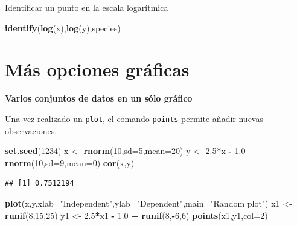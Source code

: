 \documentclass[]{book}
\newenvironment{Shaded}{\begin{snugshade}}{\end{snugshade}}
\newcommand{\KeywordTok}[1]{\textcolor[rgb]{0.13,0.29,0.53}{\textbf{#1}}}
\newcommand{\DataTypeTok}[1]{\textcolor[rgb]{0.13,0.29,0.53}{#1}}
\newcommand{\DecValTok}[1]{\textcolor[rgb]{0.00,0.00,0.81}{#1}}
\newcommand{\FloatTok}[1]{\textcolor[rgb]{0.00,0.00,0.81}{#1}}
\newcommand{\StringTok}[1]{\textcolor[rgb]{0.31,0.60,0.02}{#1}}
\newcommand{\OperatorTok}[1]{\textcolor[rgb]{0.81,0.36,0.00}{\textbf{#1}}}
\newcommand{\NormalTok}[1]{#1}
\begin{document}
Identificar un punto en la escala logarítmica

\begin{Shaded}
\begin{Highlighting}[]
\KeywordTok{identify}\NormalTok{(}\KeywordTok{log}\NormalTok{(x),}\KeywordTok{log}\NormalTok{(y),species)}
\end{Highlighting}
\end{Shaded}

\section{Más opciones gráficas}\label{muxe1s-opciones-gruxe1ficas}

\textbf{Varios conjuntos de datos en un sólo gráfico}

Una vez realizado un \texttt{plot}, el comando \texttt{points} permite
añadir nuevas observaciones.

\begin{Shaded}
\begin{Highlighting}[]
\KeywordTok{set.seed}\NormalTok{(}\DecValTok{1234}\NormalTok{)}
\NormalTok{ x <-}\StringTok{ }\KeywordTok{rnorm}\NormalTok{(}\DecValTok{10}\NormalTok{,}\DataTypeTok{sd=}\DecValTok{5}\NormalTok{,}\DataTypeTok{mean=}\DecValTok{20}\NormalTok{)}
\NormalTok{ y <-}\StringTok{ }\FloatTok{2.5}\OperatorTok{*}\NormalTok{x }\OperatorTok{-}\StringTok{ }\FloatTok{1.0} \OperatorTok{+}\StringTok{ }\KeywordTok{rnorm}\NormalTok{(}\DecValTok{10}\NormalTok{,}\DataTypeTok{sd=}\DecValTok{9}\NormalTok{,}\DataTypeTok{mean=}\DecValTok{0}\NormalTok{)}
 \KeywordTok{cor}\NormalTok{(x,y)}
\end{Highlighting}
\end{Shaded}

\begin{verbatim}
## [1] 0.7512194
\end{verbatim}

\begin{Shaded}
\begin{Highlighting}[]
 \KeywordTok{plot}\NormalTok{(x,y,}\DataTypeTok{xlab=}\StringTok{"Independent"}\NormalTok{,}\DataTypeTok{ylab=}\StringTok{"Dependent"}\NormalTok{,}\DataTypeTok{main=}\StringTok{"Random plot"}\NormalTok{)}
\NormalTok{ x1 <-}\StringTok{ }\KeywordTok{runif}\NormalTok{(}\DecValTok{8}\NormalTok{,}\DecValTok{15}\NormalTok{,}\DecValTok{25}\NormalTok{)}
\NormalTok{ y1 <-}\StringTok{ }\FloatTok{2.5}\OperatorTok{*}\NormalTok{x1 }\OperatorTok{-}\StringTok{ }\FloatTok{1.0} \OperatorTok{+}\StringTok{ }\KeywordTok{runif}\NormalTok{(}\DecValTok{8}\NormalTok{,}\OperatorTok{-}\DecValTok{6}\NormalTok{,}\DecValTok{6}\NormalTok{)}
 \KeywordTok{points}\NormalTok{(x1,y1,}\DataTypeTok{col=}\DecValTok{2}\NormalTok{)}
\end{Highlighting}
\end{Shaded}
\end{document}
